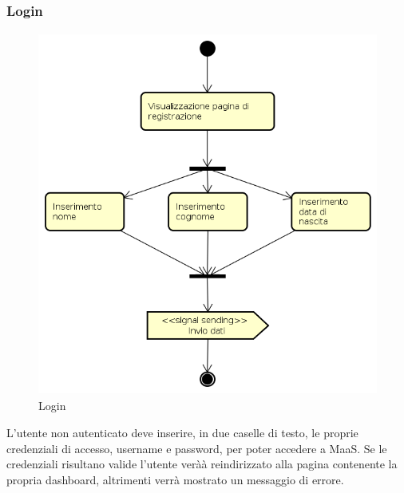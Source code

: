 \subsubsection{Login}
\begin{figure}[H]
\begin{center}
\includegraphics[height=12cm]{res/sections/backend/activities/registrazione.png}
\caption{Login}
\end{center}
\end{figure}
L'utente non autenticato deve inserire, in due caselle di testo, le proprie credenziali di accesso, username e password, per poter accedere a MaaS. Se le credenziali risultano valide l'utente veràà reindirizzato alla pagina contenente la propria dashboard, altrimenti verrà mostrato un messaggio di errore.
